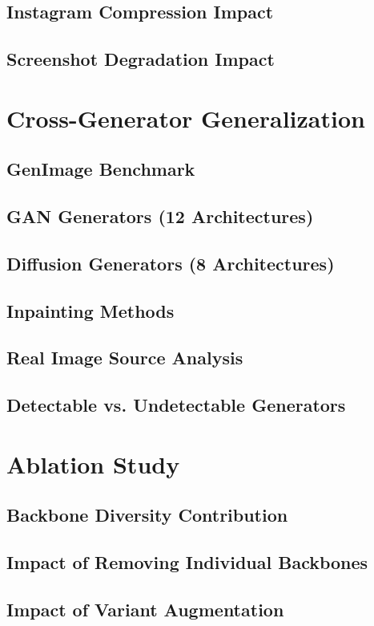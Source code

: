 \subsection{Instagram Compression Impact}
\subsection{Screenshot Degradation Impact}

\section{Cross-Generator Generalization}\label{sec:cross-gen}
\subsection{GenImage Benchmark}
\subsection{GAN Generators (12 Architectures)}
\subsection{Diffusion Generators (8 Architectures)}
\subsection{Inpainting Methods}
\subsection{Real Image Source Analysis}
\subsection{Detectable vs. Undetectable Generators}

\section{Ablation Study}\label{sec:ablation}
\subsection{Backbone Diversity Contribution}
\subsection{Impact of Removing Individual Backbones}
\subsection{Impact of Variant Augmentation}

